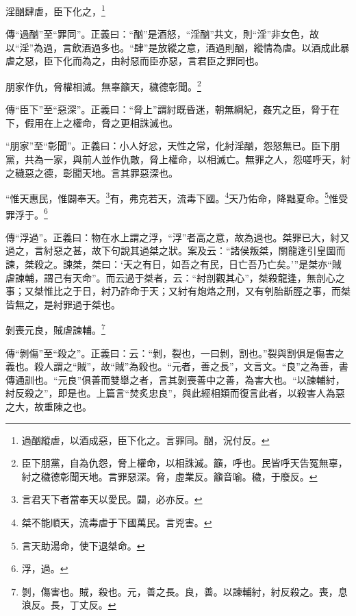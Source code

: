 淫酗肆虐，臣下化之，\footnote{過酗縱虐，以酒成惡，臣下化之。言罪同。酗，況付反。}

{\noindent\zhuan{}\fzbyks 傳“過酗”至“罪同”。正義曰：“酗”是酒怒，“淫酗”共文，則“淫”非女色，故以“淫”為過，言飲酒過多也。“肆”是放縱之意，酒過則酗，縱情為虐。以酒成此暴虐之惡，臣下化而為之，由紂惡而臣亦惡，言君臣之罪同也。 \par}

朋家作仇，脅權相滅。無辜籲天，穢德彰聞。\footnote{臣下朋黨，自為仇怨，脅上權命，以相誅滅。籲，呼也。民皆呼天告冤無辜，紂之穢德彰聞天地。言罪惡深。脅，虛業反。籲音喻。穢，于廢反。}

{\noindent\zhuan{}\fzbyks 傳“臣下”至“惡深”。正義曰：“脅上”謂紂既昏迷，朝無綱紀，姦宄之臣，脅于在下，假用在上之權命，脅之更相誅滅也。 \par}

{\noindent\shu{}\fzkt “朋家”至“彰聞”。正義曰：小人好忿，天性之常，化紂淫酗，怨怒無已。臣下朋黨，共為一家，與前人並作仇敵，脅上權命，以相滅亡。無罪之人，怨嗟呼天，紂之穢惡之德，彰聞天地。言其罪惡深也。 \par}

“惟天惠民，惟闢奉天。\footnote{言君天下者當奉天以愛民。闢，必亦反。}有，弗克若天，流毒下國。\footnote{桀不能順天，流毒虐于下國萬民。言兇害。}天乃佑命，降黜夏命。\footnote{言天助湯命，使下退桀命。}惟受罪浮于。\footnote{浮，過。}

{\noindent\zhuan{}\fzbyks 傳“浮過”。正義曰：物在水上謂之浮，“浮”者高之意，故為過也。桀罪已大，紂又過之，言紂惡之甚，故下句說其過桀之狀。案及云：“諸侯叛桀，關龍逢引皇圖而諫，桀殺之。諫桀，桀曰：‘天之有日，如吾之有民，日亡吾乃亡矣。’”是桀亦“賊虐諫輔，謂己有天命”。而云過于桀者，云：“紂剖觀其心”，桀殺龍逢，無剖心之事；又桀惟比之于日，紂乃詐命于天；又紂有炮烙之刑，又有刳胎斮脛之事，而桀皆無之，是紂罪過于桀也。 \par}

剝喪元良，賊虐諫輔。\footnote{剝，傷害也。賊，殺也。元，善之長。良，善。以諫輔紂，紂反殺之。喪，息浪反。長，丁丈反。}

{\noindent\zhuan{}\fzbyks 傳“剝傷”至“殺之”。正義曰：云：“剝，裂也，一曰剝，割也。”裂與割俱是傷害之義也。殺人謂之“賊”，故“賊”為殺也。“元者，善之長”，文言文。“良”之為善，書傳通訓也。“元良”俱善而雙舉之者，言其剝喪善中之善，為害大也。“以諫輔紂，紂反殺之”，即是也。上篇言“焚炙忠良”，與此經相類而復言此者，以殺害人為惡之大，故重陳之也。 \par}

